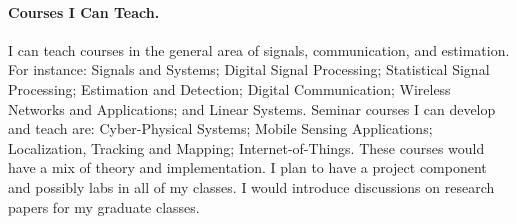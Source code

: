 \documentclass[10pt]{article}
\begin{document}
\paragraph{Courses I Can Teach. }
I can teach courses in the general area of signals, communication, and estimation. For instance: 
Signals and Systems; Digital Signal Processing; Statistical Signal Processing; Estimation and Detection; Digital Communication; Wireless Networks and Applications; and Linear Systems. 
Seminar courses I can develop and teach are: Cyber-Physical Systems; Mobile Sensing Applications; Localization, Tracking and Mapping; Internet-of-Things. 
These courses would have a mix of theory and implementation. I plan to have a project component and possibly labs in all of my classes. I would introduce discussions on research papers for my graduate classes. 



\end{document}
